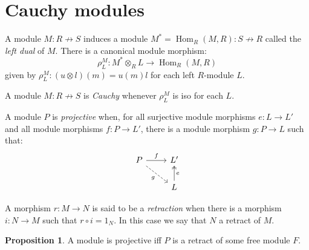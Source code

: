 \documentclass[8pt]{article}
\theoremstyle{definition}
\theoremstyle{definition}
\theoremstyle{definition}
\theoremstyle{definition}
\theoremstyle{definition}
\theoremstyle{definition}
\theoremstyle{definition}
\newtheorem{prop}{Proposition}[section]
\theoremstyle{definition}
\theoremstyle{definition}
\theoremstyle{definition}
\theoremstyle{definition}
\theoremstyle{definition}
\theoremstyle{definition}
\theoremstyle{definition}
\theoremstyle{question}
\begin{document}
\section{Cauchy modules}

A module $M : R \not\to S$ induces a module $M^* = \operatorname{Hom}_R(M, R) : S \not\to R$ called
the \emph{left dual} of $M$. There is a canonical module morphism:
\[
\rho^M_L : M^* \otimes_R L \to \operatorname{Hom}_R(M, R)
\]
given by $\rho^M_L : (u \otimes l)(m) = u(m)l$ for each left $R$-module $L$.

A module $M :  R \not\to S$ is \emph{Cauchy} whenever $\rho^M_L$ is iso for each $L$.

A module $P$ is \emph{projective} when, for all surjective module morphisms $e : L \to L'$
and all module morphisms $f : P \to L'$, there is a module morphism $g : P \to L$ such that:
\[
\begin{tikzcd}
P \ar[r, "f"] \ar[dr, "g"', dashed] & L' \\
& L \ar[u, twoheadrightarrow, "e"'] 
\end{tikzcd}
\]

A morphism $r : M \to N$ is said to be a \emph{retraction} when there is a morphism $i : N \to M$ such that $r \circ i = 1_N$.
In this case we say that $N$ a retract of $M$.

\begin{prop}
  A module is projective iff $P$ is a retract of some free module $F$.
\end{prop}
\end{document}
